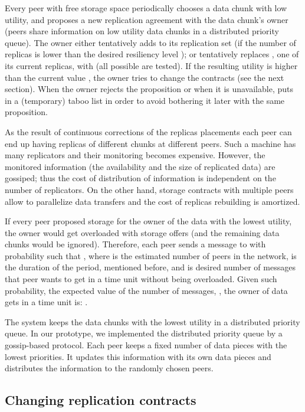 \documentclass[10pt, final, conference, letterpaper]{IEEEtran}
\begin{document}
Every peer  with free storage space periodically chooses a data chunk  with low utility, and proposes a new replication agreement with the data chunk's owner  (peers share information on low utility data chunks in a distributed priority queue).
The owner either tentatively adds  to its replication set  (if the number of replicas  is lower than the desired resiliency level ); or tentatively replaces , one of its current replicas, with  (all possible  are tested). If the resulting utility  is higher than the current value , the owner  tries to change the contracts (see the next section). When the owner rejects the proposition or when it is unavailable,  puts  in a (temporary)  taboo list in order to avoid bothering it later with the same proposition. 

As the result of continuous corrections of the replicas placements each peer can end up having replicas of different chunks at different peers. Such a machine has many replicators and their monitoring becomes expensive. However, the monitored information (the availability and the size of replicated data) are gossiped; thus the cost of distribution of information is independent on the number of replicators. On the other hand, storage contracts with multiple peers allow to parallelize data transfers and the cost of replicas rebuilding is amortized.

If every peer proposed storage for the owner of the data with the lowest utility, the owner would get overloaded with storage offers (and the remaining data chunks would be ignored).
Therefore, each peer sends a message to  with probability  such that , where  is the estimated number of peers in the network,  is the duration of the period, mentioned before, and  is desired number of messages that peer wants to get in a time unit without being overloaded. 
Given such probability, the expected value of the number of messages, , the owner of data gets in a time unit is: .

The system keeps the data chunks with the lowest utility in a distributed priority queue. 
In our prototype, we implemented the distributed priority queue by a gossip-based protocol. Each peer keeps a fixed number of data pieces with the lowest priorities. It updates this information with its own data pieces and distributes the information to the randomly chosen peers.

\subsection{Changing replication contracts}
\end{document}

